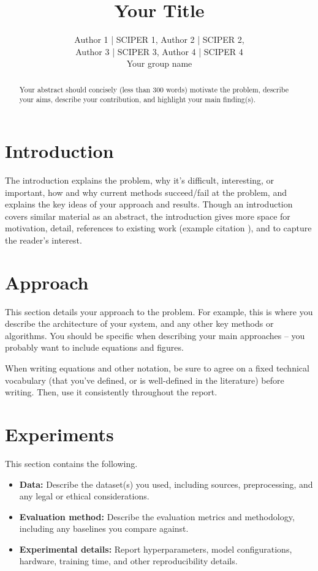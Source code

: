 \documentclass[11pt]{article}
\title{Your Title}
\author{\normalfont
Author 1 | SCIPER 1,
Author 2 | SCIPER 2, \\
Author 3 | SCIPER 3,
Author 4 | SCIPER 4 \\
Your group name
}
\begin{document}
\maketitle
\thispagestyle{fancy}

\begin{abstract}
Your abstract should concisely (less than 300 words) motivate the problem, describe your aims, describe your contribution, and highlight your main finding(s).
\end{abstract}

\section{Introduction}
The introduction explains the problem, why it’s difficult, interesting, or important, how and why current methods succeed/fail at the problem, and explains the key ideas of your approach and results. Though an introduction covers similar material as an abstract, the introduction gives more space for motivation, detail, references to existing work (example citation \cite{andrew2007scalable}), and to capture the reader’s interest.


\section{Approach}
This section details your approach to the problem. For example, this is where you describe the architecture of your system, and any other key methods or algorithms. You should be specific when describing your main approaches – you probably want to include equations and figures.

When writing equations and other notation, be sure to agree on a fixed technical vocabulary (that you’ve defined, or is well-defined in the literature) before writing. Then, use it consistently throughout the report.

\section{Experiments}
This section contains the following.

\begin{itemize}
    \item \textbf{Data:} Describe the dataset(s) you used, including sources, preprocessing, and any legal or ethical considerations.
    \item \textbf{Evaluation method:} Describe the evaluation metrics and methodology, including any baselines you compare against.
    \item \textbf{Experimental details:} Report hyperparameters, model configurations, hardware, training time, and other reproducibility details.
\end{itemize}
\end{document}
